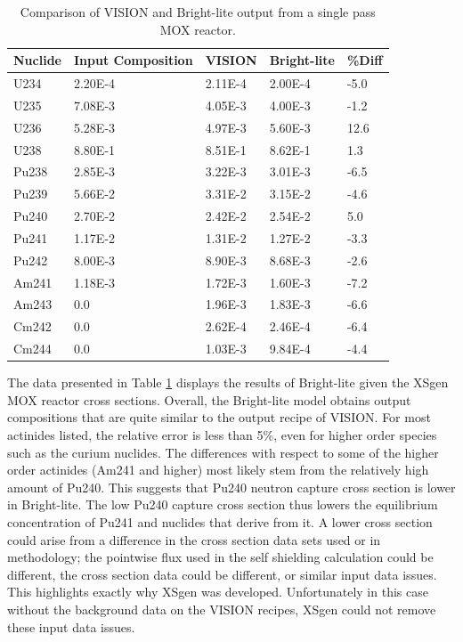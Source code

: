 \documentclass{article}
\begin{document}
\begin{table}[!htb]
\centering
\caption{Comparison of VISION and Bright-lite output from a single pass MOX reactor.}
\label{tab:g}
\begin{tabular}{lllll}
Nuclide & Input Composition & VISION & Bright-lite & \%Diff \\
\hline
U234 & 2.20E-4 & 2.11E-4 & 2.00E-4 & -5.0\\
U235 & 7.08E-3 & 4.05E-3 & 4.00E-3 & -1.2\\
U236 & 5.28E-3 & 4.97E-3 & 5.60E-3 & 12.6\\
U238 & 8.80E-1 & 8.51E-1 & 8.62E-1 & 1.3\\
Pu238 & 2.85E-3 & 3.22E-3 & 3.01E-3 & -6.5\\
Pu239 & 5.66E-2 & 3.31E-2 & 3.15E-2 & -4.6\\
Pu240 & 2.70E-2 & 2.42E-2 & 2.54E-2 & 5.0\\
Pu241 & 1.17E-2 & 1.31E-2 & 1.27E-2 & -3.3\\
Pu242 & 8.00E-3 & 8.90E-3 & 8.68E-3 & -2.6\\
Am241 & 1.18E-3 & 1.72E-3 & 1.60E-3 & -7.2\\
Am243 & 0.0 & 1.96E-3 & 1.83E-3 & -6.6\\
Cm242 & 0.0 & 2.62E-4 & 2.46E-4 & -6.4\\
Cm244 & 0.0 & 1.03E-3 & 9.84E-4 & -4.4
\end{tabular}
\end{table}

The data presented in Table \ref{tab:g} displays the results of Bright-lite given the XSgen MOX
reactor cross sections. Overall, the Bright-lite model obtains output compositions that
are quite similar to the output recipe of VISION. For most actinides listed, the relative error
is less than 5\%, even for higher order species such as the curium nuclides.
The differences with respect to some of the higher order actinides (Am241 and higher) most
likely stem from the relatively high amount of Pu240. This suggests that Pu240 neutron capture
cross section is lower in Bright-lite. The low Pu240 capture cross section thus lowers the equilibrium concentration of Pu241 and
nuclides that derive from it. A lower cross section could arise from a difference in the cross
section data sets used or in methodology; the pointwise flux used in the self shielding calculation could
be different, the cross section data could be different, or similar input data issues. This highlights exactly 
why XSgen was developed. Unfortunately in this case without the background data on the VISION recipes, XSgen 
could not remove these input data issues. 
\end{document}
